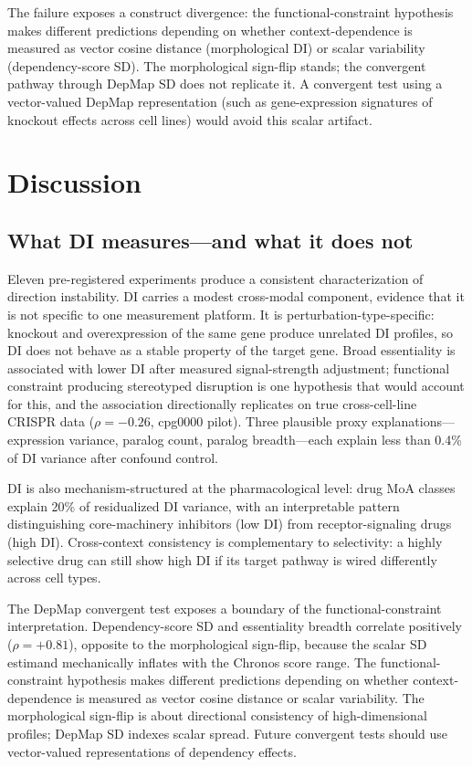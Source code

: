 \documentclass[11pt]{article}
\begin{document}
The failure exposes a construct divergence: the
functional-constraint hypothesis makes different predictions depending
on whether context-dependence is measured as vector cosine distance
(morphological DI) or scalar variability (dependency-score SD).  The
morphological sign-flip stands; the convergent pathway through DepMap SD
does not replicate it.  A convergent test using a vector-valued DepMap
representation (such as gene-expression signatures of knockout effects
across cell lines) would avoid this scalar artifact.


\section{Discussion}
\label{sec:discussion}

\subsection{What DI measures---and what it does not}

Eleven pre-registered experiments produce a consistent characterization
of direction instability.  DI carries a modest cross-modal
component, evidence that it is not specific to one measurement platform.
It is perturbation-type-specific: knockout and overexpression of the same
gene produce unrelated DI profiles, so DI does not behave as a stable
property of the target gene.  Broad essentiality is associated with lower
DI after measured signal-strength adjustment; functional constraint
producing stereotyped disruption is one hypothesis that would account for
this, and the association directionally replicates on true cross-cell-line
CRISPR data ($\rho = -0.26$, cpg0000 pilot).  Three
plausible proxy explanations---expression variance, paralog count,
paralog breadth---each explain less than 0.4\% of DI variance after
confound control.

DI is also mechanism-structured at the pharmacological level: drug MoA
classes explain 20\% of residualized DI variance, with an interpretable
pattern distinguishing core-machinery inhibitors (low DI) from
receptor-signaling drugs (high DI).  Cross-context consistency is
complementary to selectivity: a highly selective drug can still show high DI if
its target pathway is wired differently across cell types.

The DepMap convergent test exposes a boundary of the
functional-constraint interpretation.  Dependency-score SD and
essentiality breadth correlate positively ($\rho = +0.81$), opposite to
the morphological sign-flip, because the scalar SD estimand mechanically
inflates with the Chronos score range.  The functional-constraint
hypothesis makes different predictions depending on whether
context-dependence is measured as vector cosine distance or scalar
variability.  The morphological sign-flip is about directional
consistency of high-dimensional profiles; DepMap SD indexes scalar
spread.  Future convergent tests should use vector-valued representations
of dependency effects.
\end{document}
